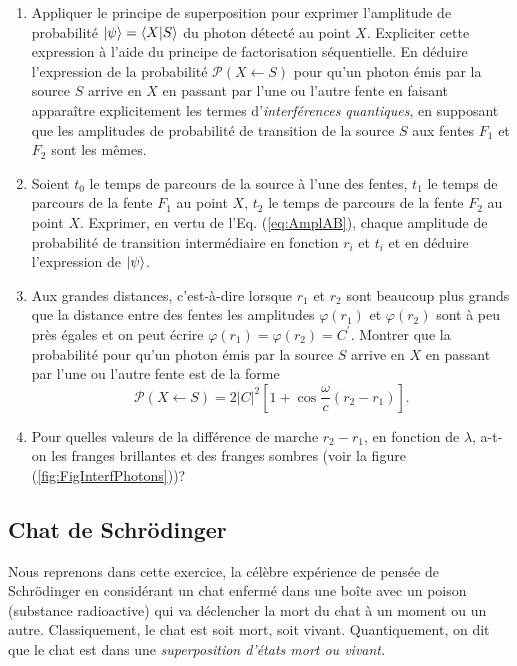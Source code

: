 \begin{enumerate}
\item Appliquer le principe de superposition pour exprimer l'amplitude de
probabilité $\vert\psi\rangle =\langle X\vert S\rangle$ du photon détecté au point $X$.
Expliciter cette expression à l'aide du principe de factorisation séquentielle.
En déduire l'expression de la probabilité $\mathcal{P}(X\leftarrow S)$ pour
qu'un photon émis par la source $S$ arrive en $X$ en passant par l'une ou
l'autre fente en faisant apparaître explicitement les termes
d'\emph{interférences quantiques}, en supposant que les amplitudes de
probabilité de transition de la source $S$ aux fentes $F_1$ et $F_2$ sont
les mêmes.

\item Soient $t_{0}$ le temps de parcours de la source à l'une des fentes,
$t_1$ le temps de parcours de la fente $F_1$ au point $X$, $t_2$ le
temps de parcours de la fente $F_2$ au point $X$. Exprimer, en vertu de
l'Eq. (\ref{eq:AmplAB}), chaque amplitude de probabilité de transition
intermédiaire en fonction $r_{i}$ et $t_{i}$ et en déduire l'expression de
$\vert\psi\rangle $.

\item Aux grandes distances, c'est-à-dire lorsque $r_1$ et $r_2$ sont
beaucoup plus grands que la distance entre des fentes les amplitudes
$\varphi(r_1)$ et $\varphi(r_2)$ sont à peu près égales et on peut écrire
$\varphi(r_1)=\varphi(r_2)=C^{\prime}$. Montrer que la probabilité pour
qu'un photon émis par la source $S$ arrive en $X$ en passant par l'une ou
l'autre fente est de la forme%
\begin{equation}
\mathcal{P}(X\leftarrow S)=2|C|^{2}\left[1+\cos\frac{\omega}{c}(r_2-r_1)
\right].
\end{equation}

\item Pour quelles valeurs de la différence de marche $r_2-r_1$, en
fonction de $\lambda$, a-t-on les franges brillantes et des franges sombres
(voir la figure (\ref{fig:FigInterfPhotons}))?
\end{enumerate}

\subsection{Chat de Schrödinger}

Nous reprenons dans cette exercice, la célèbre expérience de pensée de
Schrödinger en considérant un chat enfermé dans une boîte avec un poison
(substance radioactive) qui va déclencher la mort du chat à un moment ou un
autre. Classiquement, le chat est soit mort, soit vivant. Quantiquement, on
dit que le chat est dans une \emph{superposition d'états mort ou vivant.}

